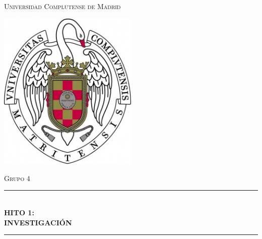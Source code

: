 \documentclass[12pt]{article}
\begin{document}
\begin{titlepage}

\newcommand{\HRule}{\rule{\linewidth}{0.5mm}} 

\center %
 
 

\textsc{\LARGE Universidad Complutense de Madrid}\\[0.1cm] %

\begin{center}
	\centering
	\includegraphics[width=0.5\textwidth]{logo}
\end{center}
 
 

\textsc{\LARGE Grupo 4}\\[0.1cm] %



\HRule \\[0.4cm]
{ \huge \bfseries HITO 1: }\\[0.4cm] %
{ \huge \bfseries INVESTIGACIÓN }\\[0.2cm] %
\HRule \\[1.2cm]
 

\end{titlepage}
\end{document}
